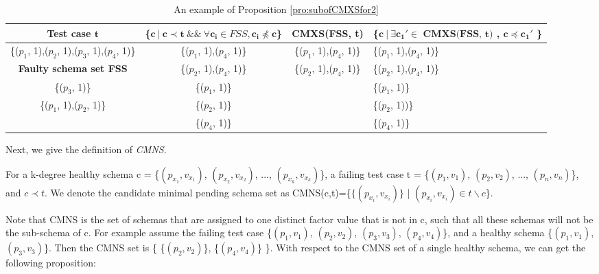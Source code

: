 \documentclass{sig-alternate-05-2015}
\begin{document}

\begin{table}[ht]
  \centering
  \setlength{\tabcolsep}{2pt}
  \caption{An example of Proposition \ref{pro:subofCMXSfor2}}
    \begin{tabular}{|c|c|c|C{5cm}|}
    \hline
  \textbf{  Test case $\textbf{t}$} & \textbf{ \{$\textbf{c}\ |\ \textbf{c} \prec \textbf{t}\ \&\&\ \forall \textbf{c}_{\textbf{i}} \in FSS, \textbf{c}_{\textbf{i}} \npreceq \textbf{c}$\} }& \textbf{  CMXS(FSS, t)} & \textbf{\{$ \textbf{c}\ |\ \exists \textbf{c}_{\textbf{1}}' \in \textbf{ CMXS(FSS, t)} $ , $\textbf{c} \preceq \textbf{c}_{\textbf{1}}'$ \}}\\\hline
    \{($p_{1}$, 1),($p_{2}$, 1),($p_{3}$, 1),($p_{4}$, 1)\}  & \{($p_{1}$, 1),($p_{4}$, 1)\} & \{($p_{1}$, 1),($p_{4}$, 1)\} & \{($p_{1}$, 1),($p_{4}$, 1)\}\\ 
      \textbf{Faulty schema set FSS}  & \{($p_{2}$, 1),($p_{4}$, 1)\} &  \{($p_{2}$, 1),($p_{4}$, 1)\} & \{($p_{2}$, 1),($p_{4}$, 1)\} \\
     \{($p_{3}$, 1)\}         & \{($p_{1}$, 1)\}&  &\{($p_{1}$, 1)\}\\
     \{($p_{1}$, 1),($p_{2}$, 1)\}  &       \{($p_{2}$, 1)\} &  &\{($p_{2}$, 1))\}\\
          &       \{($p_{4}$, 1)\} &  & \{($p_{4}$, 1)\}\\\hline
    \end{tabular}%
  \label{examleOfCMXSPro2}%
\end{table}%
%
%


Next, we give the definition of \emph{CMNS}.

\begin{definition}
For a k-degree healthy schema c = \{$(p_{x_{1}}, v_{x_{1}})$, $(p_{x_{2}}, v_{x_{2}})$, ..., $(p_{x_{k}}, v_{x_{k}})$\}, a failing test case t = \{$(p_{1}, v_{1})$, $(p_{2}, v_{2})$, ..., $(p_{n}, v_{n})$\}, and $c \prec t$. We denote the candidate minimal pending schema set as CMNS(c,t)=\{$\{(p_{x_{i}}, v_{x_{i}})\}$ | $(p_{x_{i}}, v_{x_{i}}) \in t \backslash c $\}.
\end{definition}

Note that CMNS is the set of schemas that are assigned to one distinct factor value that is not in c, such that all these schemas will not be the sub-schema of c. For example assume the failing test case \{$(p_{1}, v_{1})$, $(p_{2}, v_{2})$, $(p_{3}, v_{3})$, $(p_{4}, v_{4})$\}, and a healthy schema \{$(p_{1}, v_{1})$, $(p_{3}, v_{3})$\}. Then the CMNS set is \{ \{$(p_{2}, v_{2})$\}, \{$(p_{4}, v_{4})$\} \}.  With respect to the CMNS set of a single healthy schema, we can get the following proposition:
\end{document}
